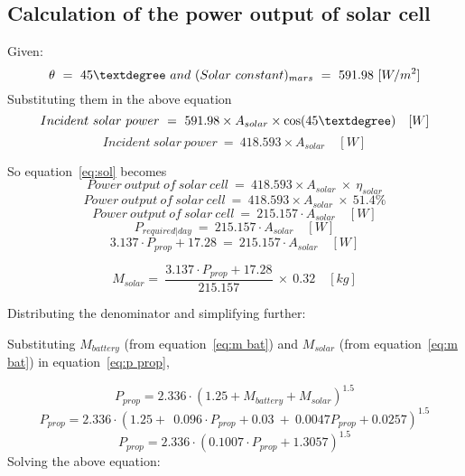 \subsection{Calculation of the power output of solar cell}
 
Given:
\[ \theta \ = \ 45 \textdegree \ and \  (Solar\ constant)_{mars} \ = \ 591.98 \ [W/m^2] \]
Substituting them in the above equation
\[ Incident \ solar \ power \ = \ 591.98 \times A_{solar} \times \cos(45\textdegree) \quad [W] \]
\[ Incident \ solar \ power \ = \ 418.593 \times A_{solar} \quad [W] \]

So equation~\ref{eq:sol} becomes
\[ Power \ output \ of \ solar \ cell \ = \ 418.593 \times A_{solar} \ \times \ \eta_{solar} \]
\[ Power \ output \ of \ solar \ cell \ = \ 418.593 \times A_{solar} \ \times \ 51.4\% \]
\[ Power \ output \ of \ solar \ cell \ = \ 215.157 \cdot A_{solar} \quad [W] \]
\[ P_{required|day} \ = \ 215.157 \cdot A_{solar} \quad [W] \]
\[ 3.137 \cdot P_{prop} + 17.28 \ = \ 215.157 \cdot A_{solar} \quad [W] \]



\[ M_{solar} = \ \frac{ 3.137 \cdot P_{prop} + 17.28 }{ 215.157 } \ \times \ 0.32 \quad [kg] \]

Distributing the denominator and simplifying further:
\vspace{0.5cm}

\p Substituting $ M_{battery} $ (from equation~\ref{eq:m bat}) and $ M_{solar} $ (from equation~\ref{eq:m bat}) in equation~\ref{eq:p prop},

\[ P_{prop} = 2.336 \cdot (1.25 + M_{battery} + M_{solar})^{1.5} \]
\[ P_{prop} = 2.336 \cdot (1.25 + \ \ 0.096 \cdot P_{prop} + 0.03 \ + \ 0.0047 P_{prop} + 0.0257 )^{1.5} \] 
\[ P_{prop} = 2.336 \cdot ( 0.1007 \cdot P_{prop} + 1.3057 )^{1.5} \]
Solving the above equation:
\boxone

\vspace{1cm}

